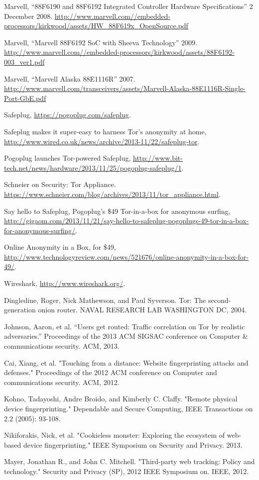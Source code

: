 \begin{thebibliography}{99}

 Marvell, ``88F6190 and 88F6192 Integrated Controller Hardware Specifications'' 2 December 2008. \url{http://www.marvell.com//embedded-processors/kirkwood/assets/HW_88F619x_OpenSource.pdf}

 Marvell, ``Marvell 88F6192 SoC with Sheeva Technology'' 2009. \url{http://www.marvell.com//embedded-processors/kirkwood/assets/88F6192-003_ver1.pdf}

 Marvell, ``Marvell Alaska 88E1116R'' 2007. \url{http://www.marvell.com/transceivers/assets/Marvell-Alaska-88E1116R-Single-Port-GbE.pdf}

 Safeplug, \url{https://pogoplug.com/safeplug}.

 Safeplug makes it super-easy to harness Tor's anonymity at home, \url{http://www.wired.co.uk/news/archive/2013-11/22/safeplug-tor}.

 Pogoplug launches Tor-powered Safeplug, \url{http://www.bit-tech.net/news/hardware/2013/11/25/pogoplug-safeplug/1}.

 Schneier on Security: Tor Appliance.  \url{https://www.schneier.com/blog/archives/2013/11/tor_appliance.html}.

 Say hello to Safeplug, Pogoplug’s \$49 Tor-in-a-box for anonymous surfing, \url{http://gigaom.com/2013/11/21/say-hello-to-safeplug-pogoplugs-49-tor-in-a-box-for-anonymous-surfing/}.

 Online Anonymity in a Box, for \$49, \url{http://www.technologyreview.com/news/521676/online-anonymity-in-a-box-for-49/}.

 Wireshark, \url{http://www.wireshark.org/}. 

 Dingledine, Roger, Nick Mathewson, and Paul Syverson. Tor: The second-generation onion router. NAVAL RESEARCH LAB WASHINGTON DC, 2004.

 Johnson, Aaron, et al. ``Users get routed: Traffic correlation on Tor by realistic adversaries.'' Proceedings of the 2013 ACM SIGSAC conference on Computer & communications security. ACM, 2013.

 Cai, Xiang, et al. "Touching from a distance: Website fingerprinting attacks and defenses." Proceedings of the 2012 ACM conference on Computer and communications security. ACM, 2012.

 Kohno, Tadayoshi, Andre Broido, and Kimberly C. Claffy. "Remote physical device fingerprinting." Dependable and Secure Computing, IEEE Transactions on 2.2 (2005): 93-108.

 Nikiforakis, Nick, et al. "Cookieless monster: Exploring the ecosystem of web-based device fingerprinting." IEEE Symposium on Security and Privacy. 2013.

 Mayer, Jonathan R., and John C. Mitchell. "Third-party web tracking: Policy and technology." Security and Privacy (SP), 2012 IEEE Symposium on. IEEE, 2012.

\end{thebibliography}
